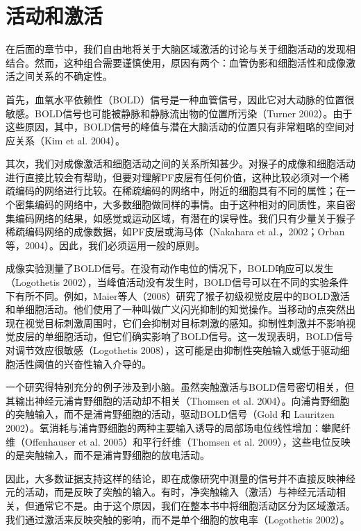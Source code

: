 \section{活动和激活}
在后面的章节中，我们自由地将关于大脑区域激活的讨论与关于细胞活动的发现相结合。然而，这种组合需要谨慎使用，原因有两个：血管伪影和细胞活性和成像激活之间关系的不确定性。
\par
首先，血氧水平依赖性（BOLD）信号是一种血管信号，因此它对大动脉的位置很敏感。BOLD信号也可能被静脉和静脉流出物的位置所污染（Turner 2002）。由于这些原因，其中，BOLD信号的峰值与潜在大脑活动的位置只有非常粗略的空间对应关系（Kim et al. 2004）。
\par
其次，我们对成像激活和细胞活动之间的关系所知甚少。对猴子的成像和细胞活动进行直接比较会有帮助，但要对理解PF皮层有任何价值，这种比较必须对一个稀疏编码的网络进行比较。在稀疏编码的网络中，附近的细胞具有不同的属性；在一个密集编码的网络中，大多数细胞做同样的事情。由于这种相对的同质性，来自密集编码网络的结果，如感觉或运动区域，有潜在的误导性。我们只有少量关于猴子稀疏编码网络的成像数据，如PF皮层或海马体（Nakahara et al.，2002；Orban等，2004）。因此，我们必须运用一般的原则。
\par
成像实验测量了BOLD信号。在没有动作电位的情况下，BOLD响应可以发生（Logothetis 2002），当峰值活动没有发生时，BOLD信号可以在不同的实验条件下有所不同。例如，Maier等人（2008）研究了猴子初级视觉皮层中的BOLD激活和单细胞活动。他们使用了一种叫做广义闪光抑制的知觉操作。当移动的点突然出现在视觉目标刺激周围时，它们会抑制对目标刺激的感知。抑制性刺激并不影响视觉皮层的单细胞活动，但它们确实影响了BOLD信号。这一发现表明，BOLD信号对调节效应很敏感（Logothetis 2008），这可能是由抑制性突触输入或低于驱动细胞活性阈值的兴奋性输入介导的。
\par
一个研究得特别充分的例子涉及到小脑。虽然突触激活与BOLD信号密切相关，但其输出神经元浦肯野细胞的活动却不相关（Thomsen et al. 2004）。向浦肯野细胞的突触输入，而不是浦肯野细胞的活动，驱动BOLD信号（Gold 和 Lauritzen 2002）。氧消耗与浦肯野细胞的两种主要输入诱导的局部场电位线性增加：攀爬纤维（Offenhauser et al. 2005）和平行纤维（Thomsen et al. 2009），这些电位反映的是突触输入，而不是浦肯野细胞的放电活动。
\par
因此，大多数证据支持这样的结论，即在成像研究中测量的信号并不直接反映神经元的活动，而是反映了突触的输入。有时，净突触输入（激活）与神经元活动相关，但通常它不是。由于这个原因，我们在整本书中将细胞活动区分为区域激活。我们通过激活来反映突触的影响，而不是单个细胞的放电率（Logothetis 2002）。
